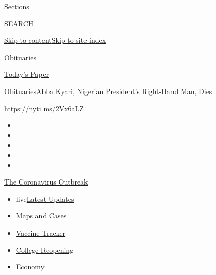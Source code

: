 Sections

SEARCH

\protect\hyperlink{site-content}{Skip to
content}\protect\hyperlink{site-index}{Skip to site index}

\href{https://www.nytimes.com/section/obituaries}{Obituaries}

\href{https://myaccount.nytimes.com/auth/login?response_type=cookie\&client_id=vi}{}

\href{https://www.nytimes.com/section/todayspaper}{Today's Paper}

\href{/section/obituaries}{Obituaries}\textbar{}Abba Kyari, Nigerian
President's Right-Hand Man, Dies

\url{https://nyti.ms/2Vx6aLZ}

\begin{itemize}
\item
\item
\item
\item
\item
\end{itemize}

\href{https://www.nytimes.com/news-event/coronavirus?action=click\&pgtype=Article\&state=default\&region=TOP_BANNER\&context=storylines_menu}{The
Coronavirus Outbreak}

\begin{itemize}
\tightlist
\item
  live\href{https://www.nytimes.com/2020/08/03/world/coronavirus-covid-19.html?action=click\&pgtype=Article\&state=default\&region=TOP_BANNER\&context=storylines_menu}{Latest
  Updates}
\item
  \href{https://www.nytimes.com/interactive/2020/us/coronavirus-us-cases.html?action=click\&pgtype=Article\&state=default\&region=TOP_BANNER\&context=storylines_menu}{Maps
  and Cases}
\item
  \href{https://www.nytimes.com/interactive/2020/science/coronavirus-vaccine-tracker.html?action=click\&pgtype=Article\&state=default\&region=TOP_BANNER\&context=storylines_menu}{Vaccine
  Tracker}
\item
  \href{https://www.nytimes.com/2020/08/02/us/covid-college-reopening.html?action=click\&pgtype=Article\&state=default\&region=TOP_BANNER\&context=storylines_menu}{College
  Reopening}
\item
  \href{https://www.nytimes.com/live/2020/08/03/business/stock-market-today-coronavirus?action=click\&pgtype=Article\&state=default\&region=TOP_BANNER\&context=storylines_menu}{Economy}
\end{itemize}

